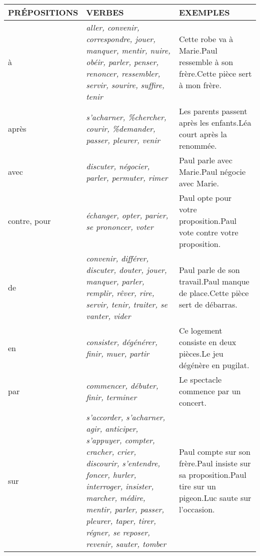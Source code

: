 \documentclass[UTF8]{report}
\begin{document}
\begin{table}[H]
    \begin{tabularx}{\textwidth}{|l|X|X|} %
    \hline
    \rowcolor{cyan!20}
    \textbf{PRÉPOSITIONS} & \textbf{VERBES} & \textbf{EXEMPLES} \\
    \hline
    à & \textit{aller, convenir, correspondre, jouer, manquer, mentir, nuire, obéir, parler, penser, renoncer, ressembler, servir, sourire, suffire, tenir}
    & Cette robe va {à Marie}.\newline Paul ressemble {à son frère}.\newline Cette pièce sert {à mon frère}. \\
    \hline
    après & \textit{s'acharner, \%chercher, courir, \%demander, passer, pleurer, venir}
    & Les parents passent {après les enfants}.\newline Léa court {après la renommée}. \\
    \hline
    avec & \textit{discuter, négocier, parler, permuter, rimer}
    & Paul parle {avec Marie}.\newline Paul négocie {avec Marie}. \\
    \hline
    contre, pour & \textit{échanger, opter, parier, se prononcer, voter}
    & Paul opte {pour votre proposition}.\newline Paul vote {contre votre proposition}. \\
    \hline
    de & \textit{convenir, différer, discuter, douter, jouer, manquer, parler, remplir, rêver, rire, servir, tenir, traiter, se vanter, vider}
    & Paul parle {de son travail}.\newline Paul manque {de place}.\newline Cette pièce sert {de débarras}. \\
    \hline
    en & \textit{consister, dégénérer, finir, muer, partir}
    & Ce logement consiste {en deux pièces}.\newline Le jeu dégénère {en pugilat}. \\
    \hline
    par & \textit{commencer, débuter, finir, terminer}
    & Le spectacle commence {par un concert}. \\
    \hline
    sur & \textit{s'accorder, s'acharner, agir, anticiper, s'appuyer, compter, cracher, crier, discourir, s'entendre, foncer, hurler, interroger, insister, marcher, médire, mentir, parler, passer, pleurer, taper, tirer, régner, se reposer, revenir, sauter, tomber}
    & Paul compte {sur son frère}.\newline Paul insiste {sur sa proposition}.\newline Paul tire {sur un pigeon}.\newline Luc saute {sur l'occasion}. \\

\end{tabularx}
\end{table}
\end{document}
